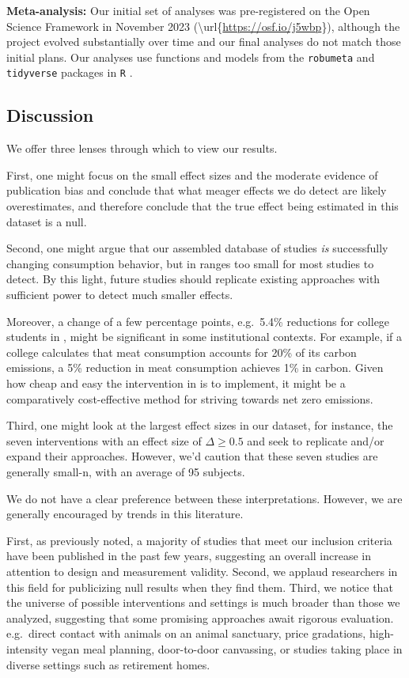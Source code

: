 \documentclass[sn-nature,pdflatex]{sn-jnl}
\begin{document}
\textbf{Meta-analysis:} Our initial set of analyses was pre-registered
on the Open Science Framework in November 2023
(\textbackslash url\{\url{https://osf.io/j5wbp}\}), although the project
evolved substantially over time and our final analyses do not match
those initial plans. Our analyses use functions and models from the
\texttt{robumeta} \citep{fisher2015} and \texttt{tidyverse}
\citep{wickham2019} packages in \texttt{R} \citep{Rlang}.

\subsection{Discussion}\label{discussion}

We offer three lenses through which to view our results.

First, one might focus on the small effect sizes and the moderate
evidence of publication bias and conclude that what meager effects we do
detect are likely overestimates, and therefore conclude that the true
effect being estimated in this dataset is a null.

Second, one might argue that our assembled database of studies \emph{is}
successfully changing consumption behavior, but in ranges too small for
most studies to detect. By this light, future studies should replicate
existing approaches with sufficient power to detect much smaller
effects.

Moreover, a change of a few percentage points, e.g.~5.4\% reductions for
college students in \citep{jalil2023}, might be significant in some
institutional contexts. For example, if a college calculates that meat
consumption accounts for 20\% of its carbon emissions, a 5\% reduction
in meat consumption achieves 1\% in carbon. Given how cheap and easy the
intervention in \citep{jalil2023} is to implement, it might be a
comparatively cost-effective method for striving towards net zero
emissions.

Third, one might look at the largest effect sizes in our dataset, for
instance, the seven interventions with an effect size of
\(\Delta \geq 0.5\)
\citep{bianchi2022, carfora2023, merrill2009, piester2020} and seek to
replicate and/or expand their approaches. However, we'd caution that
these seven studies are generally small-n, with an average of 95
subjects.

We do not have a clear preference between these interpretations.
However, we are generally encouraged by trends in this literature.

First, as previously noted, a majority of studies that meet our
inclusion criteria have been published in the past few years, suggesting
an overall increase in attention to design and measurement validity.
Second, we applaud researchers in this field for publicizing null
results when they find them. Third, we notice that the universe of
possible interventions and settings is much broader than those we
analyzed, suggesting that some promising approaches await rigorous
evaluation. e.g.~direct contact with animals on an animal sanctuary,
price gradations, high-intensity vegan meal planning, door-to-door
canvassing, or studies taking place in diverse settings such as
retirement homes.
\end{document}
